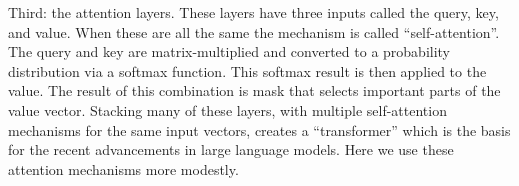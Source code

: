 Third: the attention layers. These layers have three inputs called the query, key, and value. When these are all the same the mechanism is called ``self-attention''. The query and key are matrix-multiplied and converted to a probability distribution via a softmax function. This softmax result is then applied to the value. The result of this combination is mask that selects important parts of the value vector. Stacking many of these layers, with multiple self-attention mechanisms for the same input vectors, creates a ``transformer'' \cite{vaswani_attention_2017} which is the basis for the recent advancements in large language models. Here we use these attention mechanisms more modestly.


